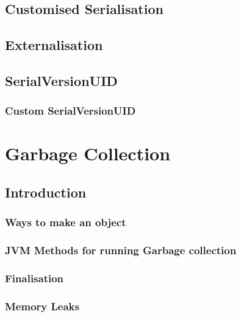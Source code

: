 \documentclass[14pt,fleqn]{extbook} %
\begin{document}
\section{Customised Serialisation}

\section{Externalisation}

\section{SerialVersionUID}

\subsection{Custom SerialVersionUID}



\chapter{Garbage Collection}
\section{Introduction}

\subsection{Ways to make an object}

\subsection{JVM Methods for running Garbage collection}

\subsection{Finalisation}

\subsection{Memory Leaks}

\end{document}
